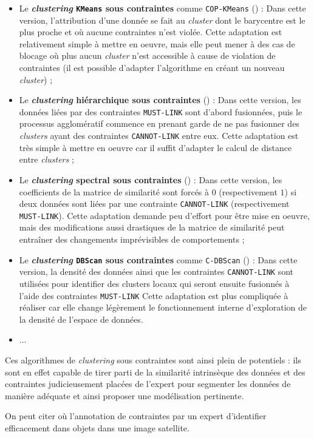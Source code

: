 		\begin{itemize}
			\item Le \textbf{\textit{clustering} \texttt{KMeans} sous contraintes} comme \texttt{COP-KMeans} (\cite{wagstaff-etal:2001:constrained-kmeans-clustering}) :
			Dans cette version, l'attribution d'une donnée se fait au \textit{cluster} dont le barycentre est le plus proche et où aucune contraintes n'est violée.
			Cette adaptation est relativement simple à mettre en oeuvre, mais elle peut mener à des cas de blocage où plus aucun \textit{cluster} n'est accessible à cause de violation de contraintes (il est possible d'adapter l'algorithme en créant un nouveau \textit{cluster}) ;
			\item Le \textbf{\textit{clustering} hiérarchique sous contraintes} (\cite{davidson-ravi:2005:agglomerative-hierarchical-clustering}) :
			Dans cette version, les données liées par des contraintes \texttt{MUST-LINK} sont d'abord fusionnées, puis le processus agglomératif commence en prenant garde de ne pas fusionner des \textit{clusters} ayant des contraintes \texttt{CANNOT-LINK} entre eux.
			Cette adaptation est très simple à mettre en oeuvre car il suffit d'adapter le calcul de distance entre \textit{clusters} ;
			\item Le \textbf{\textit{clustering} spectral sous contraintes} (\cite{kamvar-etal:2003:spectral-learning}) :
			Dans cette version, les coefficients de la matrice de similarité sont forcés à $0$ (respectivement $1$) si deux données sont liées par une contrainte \texttt{CANNOT-LINK} (respectivement \texttt{MUST-LINK}).
			Cette adaptation demande peu d'effort pour être mise en oeuvre, mais des modifications aussi drastiques de la matrice de similarité peut entraîner des changements imprévisibles de comportements ;
			\item Le \textbf{\textit{clustering} \texttt{DBScan} sous contraintes} comme \texttt{C-DBScan} (\cite{ruiz-etal:2010:densitybased-semisupervised-clustering}) :
			Dans cette version, la densité des données ainsi que les contraintes \texttt{CANNOT-LINK} sont utilisées pour identifier des clusters locaux qui seront ensuite fusionnés à l'aide des contraintes \texttt{MUST-LINK}
			Cette adaptation est plus compliquée à réaliser car elle change légèrement le fonctionnement interne d'exploration de la densité de l'espace de données.
			\item ...
		\end{itemize}
		
		Ces algorithmes de \textit{clustering} sous contraintes sont ainsi plein de potentiels : ils sont en effet capable de tirer parti de la similarité intrinsèque des données et des contraintes judicieusement placées de l'expert pour segmenter les données de manière adéquate et ainsi proposer une modélisation pertinente.
		\begin{leftBarExamples}
			On peut citer \cite{lampert-etal:2019:constrained-distance-based} où l'annotation de contraintes par un expert d'identifier efficacement dans objets dans une image satellite.
		\end{leftBarExamples}
		
